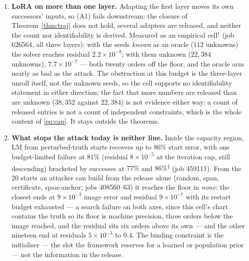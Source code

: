 \begin{enumerate}
\item \textbf{LoRA on more than one layer.} Adapting the first layer moves
  its own successors' inputs, so (A1) fails downstream: the closure of
  Theorem~\ref{thm:traj} does not hold, several adapters are released, and
  neither the count nor identifiability is derived. Measured as an empirical
  cell$^\dagger$ (job 626564, all three layers): with the seeds \emph{known}
  as an oracle ($112$ unknowns) the solver reaches residual
  $2.2\times10^{-8}$; with them unknown ($22{,}384$ unknowns),
  $7.7\times10^{-7}$ — both twenty orders off the floor, and the oracle arm
  nearly as bad as the attack. The obstruction at this budget is the
  three-layer unroll itself, not the unknown seeds, so the cell supports no
  identifiability statement in either direction; the fact that more numbers
  are released than are unknown ($38{,}352$ against $22{,}384$) is not
  evidence either way: a count of released entries is not a count of
  independent constraints, which is the whole content of \eqref{eq:cap}. It stays outside
  the theorems.
\item \textbf{What stops the attack today is neither line.} Inside the
  capacity region, LM from perturbed-truth starts recovers up to $86\%$ start
  error, with one budget-limited failure at $81\%$ (residual $8\times10^{-5}$
  at the iteration cap, still descending) bracketed by successes at $77\%$
  and $86\%$\textsuperscript{$\dagger$} (job 459111). From the $20$ starts an attacker can build
  from the release alone (random, span, certificate, span-anchor; jobs
  408560--63) it reaches the floor in \emph{none}: the closest ends at
  $9\times10^{-3}$ image error and residual $9\times10^{-7}$ with its restart
  budget exhausted — a search failure on both axes, since this cell's chart
  contains the truth so its floor is machine precision, three orders below the
  image reached, and the residual sits six orders above its own — and the other nineteen end at residuals
  $5\times10^{-3}$ to $0.4$. The binding constraint is the initialiser — the
  slot the framework reserves for a learned or population prior — not the
  information in the release.
\end{enumerate}

